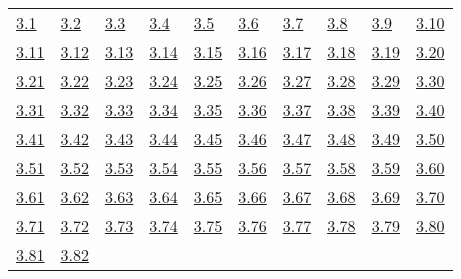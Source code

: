 \begin{tabular}{llllllllll}
\hyperref[Exercise 3.1]{3.1} &
\hyperref[Exercise 3.2]{3.2} &
\hyperref[Exercise 3.3]{3.3} &
\hyperref[Exercise 3.4]{3.4} &
\hyperref[Exercise 3.5]{3.5} &
\hyperref[Exercise 3.6]{3.6} &
\hyperref[Exercise 3.7]{3.7} &
\hyperref[Exercise 3.8]{3.8} &
\hyperref[Exercise 3.9]{3.9} &
\hyperref[Exercise 3.10]{3.10}
\\ 
\hyperref[Exercise 3.11]{3.11} &
\hyperref[Exercise 3.12]{3.12} &
\hyperref[Exercise 3.13]{3.13} &
\hyperref[Exercise 3.14]{3.14} &
\hyperref[Exercise 3.15]{3.15} &
\hyperref[Exercise 3.16]{3.16} &
\hyperref[Exercise 3.17]{3.17} &
\hyperref[Exercise 3.18]{3.18} &
\hyperref[Exercise 3.19]{3.19} &
\hyperref[Exercise 3.20]{3.20}
\\ 
\hyperref[Exercise 3.21]{3.21} &
\hyperref[Exercise 3.22]{3.22} &
\hyperref[Exercise 3.23]{3.23} &
\hyperref[Exercise 3.24]{3.24} &
\hyperref[Exercise 3.25]{3.25} &
\hyperref[Exercise 3.26]{3.26} &
\hyperref[Exercise 3.27]{3.27} &
\hyperref[Exercise 3.28]{3.28} &
\hyperref[Exercise 3.29]{3.29} &
\hyperref[Exercise 3.30]{3.30}
\\ 
\hyperref[Exercise 3.31]{3.31} &
\hyperref[Exercise 3.32]{3.32} &
\hyperref[Exercise 3.33]{3.33} &
\hyperref[Exercise 3.34]{3.34} &
\hyperref[Exercise 3.35]{3.35} &
\hyperref[Exercise 3.36]{3.36} &
\hyperref[Exercise 3.37]{3.37} &
\hyperref[Exercise 3.38]{3.38} &
\hyperref[Exercise 3.39]{3.39} &
\hyperref[Exercise 3.40]{3.40}
\\ 
\hyperref[Exercise 3.41]{3.41} &
\hyperref[Exercise 3.42]{3.42} &
\hyperref[Exercise 3.43]{3.43} &
\hyperref[Exercise 3.44]{3.44} &
\hyperref[Exercise 3.45]{3.45} &
\hyperref[Exercise 3.46]{3.46} &
\hyperref[Exercise 3.47]{3.47} &
\hyperref[Exercise 3.48]{3.48} &
\hyperref[Exercise 3.49]{3.49} &
\hyperref[Exercise 3.50]{3.50}
\\ 
\hyperref[Exercise 3.51]{3.51} &
\hyperref[Exercise 3.52]{3.52} &
\hyperref[Exercise 3.53]{3.53} &
\hyperref[Exercise 3.54]{3.54} &
\hyperref[Exercise 3.55]{3.55} &
\hyperref[Exercise 3.56]{3.56} &
\hyperref[Exercise 3.57]{3.57} &
\hyperref[Exercise 3.58]{3.58} &
\hyperref[Exercise 3.59]{3.59} &
\hyperref[Exercise 3.60]{3.60}
\\ 
\hyperref[Exercise 3.61]{3.61} &
\hyperref[Exercise 3.62]{3.62} &
\hyperref[Exercise 3.63]{3.63} &
\hyperref[Exercise 3.64]{3.64} &
\hyperref[Exercise 3.65]{3.65} &
\hyperref[Exercise 3.66]{3.66} &
\hyperref[Exercise 3.67]{3.67} &
\hyperref[Exercise 3.68]{3.68} &
\hyperref[Exercise 3.69]{3.69} &
\hyperref[Exercise 3.70]{3.70}
\\ 
\hyperref[Exercise 3.71]{3.71} &
\hyperref[Exercise 3.72]{3.72} &
\hyperref[Exercise 3.73]{3.73} &
\hyperref[Exercise 3.74]{3.74} &
\hyperref[Exercise 3.75]{3.75} &
\hyperref[Exercise 3.76]{3.76} &
\hyperref[Exercise 3.77]{3.77} &
\hyperref[Exercise 3.78]{3.78} &
\hyperref[Exercise 3.79]{3.79} &
\hyperref[Exercise 3.80]{3.80}
\\ 
\hyperref[Exercise 3.81]{3.81} &
\hyperref[Exercise 3.82]{3.82} &
\end{tabular} 


